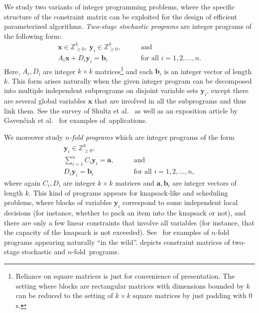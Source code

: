 \documentclass{article}
\renewcommand{\geq}{\geqslant}
\newcommand{\Z}{\mathbb{Z}}
\newcommand{\Zn}{\Z_{\geq 0}}
\newcommand{\tup}[1]{{\mathbf{#1}}}
\newcommand{\xx}{\tup x}
\newcommand{\yy}{\tup y}
\newcommand{\av}{\tup a}
\newcommand{\bb}{\tup b}
\begin{document}
We study two variants of integer programming problems, where the specific structure of the constraint matrix can be exploited for the design of efficient parameterized algorithms. {\em{Two-stage stochastic programs}} are integer programs of the following form:
\begin{align}
 \xx\in \Zn^k,\ \yy_i\in \Zn^k, &\qquad  \textrm{and}\nonumber\\
 A_i\xx + D_i\yy_i =\bb_i &\qquad \textrm{for all }i=1,2,\ldots,n.\tag{$\spadesuit$}\label{eq:twostage-form}
\end{align}
Here, $A_i,D_i$ are integer $k\times k$ matrices\footnote{Reliance on square matrices is just for convenience of presentation. The setting where blocks are rectangular matrices with dimensions bounded by $k$ can be reduced to the setting of $k\times k$ square matrices by just padding with $0$s.} and each $\bb_i$ is an integer vector of length $k$. This form arises naturally when the given integer program can be decomposed into multiple independent subprograms on disjoint variable sets $\yy_i$, except there are several global variables $\xx$ that are involved in all the subprograms and thus link them. See the survey of Shultz et al.~\cite{SchultzSvdV96} as well as an exposition article by Gaven\v{c}iak et al.~\cite{GavenciakKK22} for examples of~applications.

We moreover study {\em{$n$-fold programs}} which are integer programs of the form
\begin{align}
    \yy_i\in \Zn^k, &\nonumber \\
    \sum_{i=1}^n C_i\yy_i = \av,\nonumber & \qquad \textrm{and} \tag{$\clubsuit$}\label{eq:nfold-form}\\
    D_i\yy_i = \bb_i & \qquad \textrm{for all }i=1,2,\ldots,n,\nonumber
\end{align}
where again $C_i,D_i$ are integer $k\times k$ matrices and $\av,\bb_i$ are integer vectors of length $k$. This kind of programs appears for knapsack-like and scheduling problems, where blocks of variables $\yy_i$ correspond to some independent local decisions (for instance, whether to pack an item into the knapsack or not), and there are only a few linear constraints that involve all variables (for instance, that the capacity of the knapsack is not exceeded). See~\cite{ChenMYZ17,DeLoera2008,GavenciakKK22,JansenKMR22,KnopK18,KnopKLMO21,KnopKM20,KnopKM20b} for examples of $n$-fold programs appearing naturally ``in the wild''.  depicts constraint matrices of two-stage stochastic and $n$-fold~programs.
\end{document}
